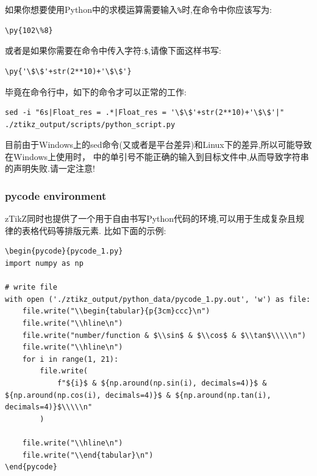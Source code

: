 如果你想要使用Python中的求模运算需要输入\texttt{\%}时,在\cmd{\py}命令中你应该写为:
\begin{verbatim}
\py{102\%8}
\end{verbatim}
    
或者是如果你需要在\cmd{\py}命令中传入字符:\texttt{\$},请像下面这样书写:
\begin{verbatim}
\py{'\$\$'+str(2**10)+'\$\$'}
\end{verbatim}

毕竟在命令行中，如下的命令才可以正常的工作:
\begin{verbatim}
sed -i "6s|Float_res = .*|Float_res = '\$\$'+str(2**10)+'\$\$'|" ./ztikz_output/scripts/python_script.py
\end{verbatim}

\begin{remark}
目前由于Windows上的sed命令(又或者是平台差异)和Linux下的差异,所以可能导致在Windows上使用时，
\cmd{\py}中的单引号不能正确的输入到目标文件中,从而导致字符串的声明失败.请一定注意!
\end{remark}


\subsubsection{pycode environment}
zTikZ同时也提供了一个用于自由书写Python代码的环境,可以用于生成复杂且规律的表格代码等排版元素.
比如下面的示例:
\begin{verbatim}
\begin{pycode}{pycode_1.py}
import numpy as np

# write file
with open ('./ztikz_output/python_data/pycode_1.py.out', 'w') as file:
    file.write("\\begin{tabular}{p{3cm}ccc}\n")
    file.write("\\hline\n")
    file.write("number/function & $\\sin$ & $\\cos$ & $\\tan$\\\\\n")
    file.write("\\hline\n")
    for i in range(1, 21):
        file.write(
            f"${i}$ & ${np.around(np.sin(i), decimals=4)}$ &  ${np.around(np.cos(i), decimals=4)}$ & ${np.around(np.tan(i), decimals=4)}$\\\\\n"
        )

    file.write("\\hline\n")
    file.write("\\end{tabular}\n")
\end{pycode}
\end{verbatim}


